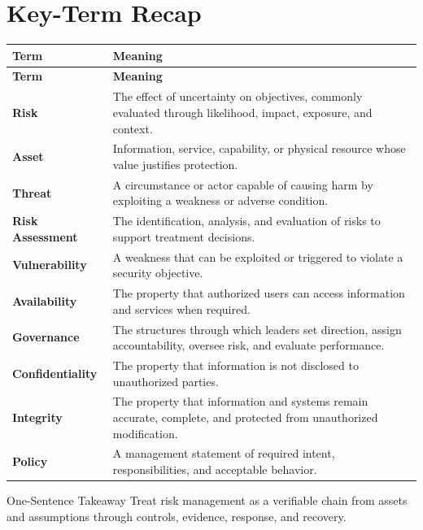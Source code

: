 \documentclass[11pt,letterpaper]{article}
\begin{document}
\section*{Key-Term Recap}
\begin{longtable}{>{\raggedright\arraybackslash}p{}>{\raggedright\arraybackslash}p{}}
\toprule\rowcolor{Navy}\color{white}\textbf{Term} & \color{white}\textbf{Meaning}\\\midrule
\endfirsthead
\toprule\rowcolor{Navy}\color{white}\textbf{Term} & \color{white}\textbf{Meaning}\\\midrule
\endhead
\textbf{Risk} & The effect of uncertainty on objectives, commonly evaluated through likelihood, impact, exposure, and context. \\\midrule
\textbf{Asset} & Information, service, capability, or physical resource whose value justifies protection. \\\midrule
\textbf{Threat} & A circumstance or actor capable of causing harm by exploiting a weakness or adverse condition. \\\midrule
\textbf{Risk Assessment} & The identification, analysis, and evaluation of risks to support treatment decisions. \\\midrule
\textbf{Vulnerability} & A weakness that can be exploited or triggered to violate a security objective. \\\midrule
\textbf{Availability} & The property that authorized users can access information and services when required. \\\midrule
\textbf{Governance} & The structures through which leaders set direction, assign accountability, oversee risk, and evaluate performance. \\\midrule
\textbf{Confidentiality} & The property that information is not disclosed to unauthorized parties. \\\midrule
\textbf{Integrity} & The property that information and systems remain accurate, complete, and protected from unauthorized modification. \\\midrule
\textbf{Policy} & A management statement of required intent, responsibilities, and acceptable behavior. \\\midrule
\bottomrule
\end{longtable}
\begin{CornellExamBox}{One-Sentence Takeaway}
Treat risk management as a verifiable chain from assets and assumptions through controls, evidence, response, and recovery.
\end{CornellExamBox}
\end{document}
